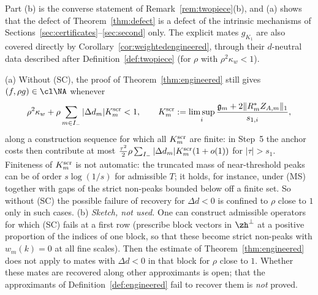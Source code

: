 Part (b) is the converse statement of Remark~\ref{rem:twopiece}(b), and
(a) shows that the defect of Theorem~\ref{thm:defect} is a defect of the
intrinsic mechanisms of Sections~\ref{sec:certificates}--\ref{sec:second}
only.  The explicit mates $g_{K_1}$ are also covered directly by
Corollary~\ref{cor:weightedengineered}, through their $d$-neutral data
described after Definition~\ref{def:twopiece} (for $\rho$ with
$\rho^2\kappa_w<1$).

\begin{remark}\label{rem:withoutSC}
(a) Without \textup{(SC)}, the proof of Theorem~\ref{thm:engineered} still
gives $(f,\rho g)\in\cl\NA$ whenever
\[
 \rho^2\kappa_w+\rho\sum_{m\in I_-}|\Delta d_m|K^{\rm scr}_m<1,\qquad
 K^{\rm scr}_m:=\limsup_i\frac{\mathfrak g_m+2\|R^*_mZ_{A,m}\|_1}{s_{1,i}},
\]
along a construction sequence for which all $K^{\rm scr}_m$ are finite: in
Step~5 the anchor costs then contribute at most
$\frac{\tau^2}2\rho\sum_{I_-}|\Delta d_m|K^{\rm scr}_m(1+o(1))$ for
$|\tau|>s_1$.  Finiteness of $K^{\rm scr}_m$ is not automatic: the truncated
mass of near-threshold peaks can be of order $s\log(1/s)$ for admissible
$T$; it holds, for instance, under \textup{(MS)} together with gaps of the
strict non-peaks bounded below off a finite set.  So without \textup{(SC)}
the possible failure of recovery for $\Delta d<0$ is confined to $\rho$
close to $1$ only in such cases.
(b) \emph{Sketch, not used.}  One can construct admissible operators for
which \textup{(SC)} fails at a first row (prescribe block vectors in
$\zh^\perp$ at a positive proportion of the indices of one block, so that
these become strict non-peaks with $w_m(k)=0$ at all fine scales).  Then the
estimate of Theorem~\ref{thm:engineered} does not apply to mates with
$\Delta d<0$ in that block for $\rho$ close to $1$.  Whether these mates are
recovered along other approximants is open; that the approximants of
Definition~\ref{def:engineered} fail to recover them is \emph{not} proved.
\end{remark}
